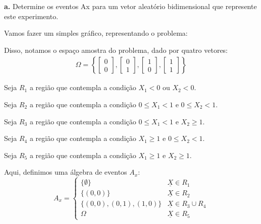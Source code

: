 \documentclass[a5paper]{report}
\begin{document}
\textbf{a.} Determine os eventos Ax para um vetor aleatório bidimensional que represente este experimento.

Vamos fazer um simples gráfico, representando o problema:

\begin{center}
\end{center}

Disso, notamos o espaço amostra do problema, dado por quatro vetores:
\begin{align*}
	\Omega = \left\{
	\begin{bmatrix}
		0\\
		0
	\end{bmatrix},
	\begin{bmatrix}
		0\\
		1
	\end{bmatrix},
	\begin{bmatrix}
		1\\
		0
	\end{bmatrix},
	\begin{bmatrix}
		1\\
		1
	\end{bmatrix}
	\right\}
\end{align*}

Seja $R_1$ a região que contempla a condição $X_1 < 0 \text{ ou } X_2 < 0$.

Seja $R_2$ a região que contempla a condição $0 \leq X_1 < 1 \text{ e } 0 \leq X_2 < 1$.

Seja $R_3$ a região que contempla a condição $0 \leq X_1 < 1 \text{ e } X_2 \geq 1$.

Seja $R_4$ a região que contempla a condição $X_1 \geq 1 \text{ e } 0 \leq X_2 < 1$.

Seja $R_5$ a região que contempla a condição $X_1 \geq 1 \text{ e } X_2 \geq 1$.

Aqui, definimos uma álgebra de eventos $A_x$:
\begin{equation*}
	A_x =
	\begin{cases}
		\{ \emptyset \} 			& \underline{X} \in R_1\\
		\{(0, 0)\} 					& \underline{X} \in R_2\\
		\{(0, 0), (0, 1), (1, 0)\}	& \underline{X} \in R_3 \cup R_4\\
		\Omega						& \underline{X} \in R_5
	\end{cases}
\end{equation*}
\end{document}
